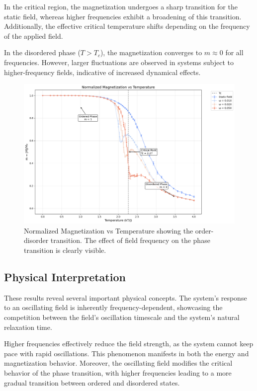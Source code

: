 \documentclass[11pt]{article}
\begin{document}
In the critical region, the magnetization undergoes a sharp transition for the static field, whereas higher frequencies exhibit a broadening of this transition. Additionally, the effective critical temperature shifts depending on the frequency of the applied field. 

In the disordered phase ($T > T_c$), the magnetization converges to $m \approx 0$ for all frequencies. However, larger fluctuations are observed in systems subject to higher-frequency fields, indicative of increased dynamical effects.

\begin{figure}[h]
\includegraphics[width=\linewidth]{plots/heating M.png}
\caption{Normalized Magnetization vs Temperature showing the order-disorder transition. The effect of field frequency on the phase transition is clearly visible.}
\label{fig:magnetization}
\end{figure}

\subsection{Physical Interpretation}

These results reveal several important physical concepts. The system's response to an oscillating field is inherently frequency-dependent, showcasing the competition between the field's oscillation timescale and the system's natural relaxation time. 

Higher frequencies effectively reduce the field strength, as the system cannot keep pace with rapid oscillations. This phenomenon manifests in both the energy and magnetization behavior. Moreover, the oscillating field modifies the critical behavior of the phase transition, with higher frequencies leading to a more gradual transition between ordered and disordered states. 
\end{document}
